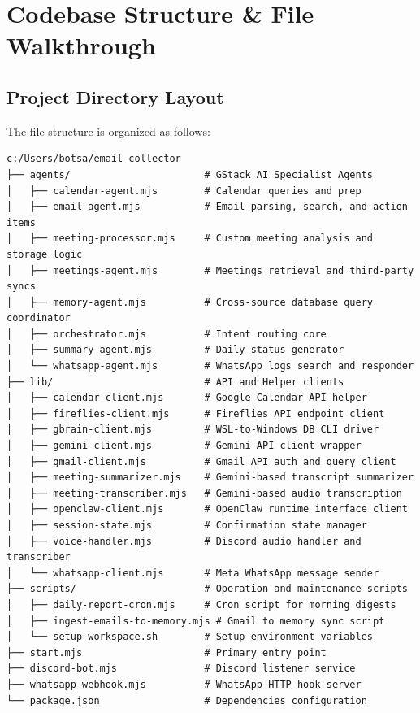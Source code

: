 \documentclass[12pt,a4paper]{report}
\begin{document}
\chapter{Codebase Structure \& File Walkthrough}
\label{chap:codebase}

\section{Project Directory Layout}
The file structure is organized as follows:
\begin{lstlisting}[basicstyle=\ttfamily\scriptsize]
c:/Users/botsa/email-collector
├── agents/                       # GStack AI Specialist Agents
│   ├── calendar-agent.mjs        # Calendar queries and prep
│   ├── email-agent.mjs           # Email parsing, search, and action items
│   ├── meeting-processor.mjs     # Custom meeting analysis and storage logic
│   ├── meetings-agent.mjs        # Meetings retrieval and third-party syncs
│   ├── memory-agent.mjs          # Cross-source database query coordinator
│   ├── orchestrator.mjs          # Intent routing core
│   ├── summary-agent.mjs         # Daily status generator
│   └── whatsapp-agent.mjs        # WhatsApp logs search and responder
├── lib/                          # API and Helper clients
│   ├── calendar-client.mjs       # Google Calendar API helper
│   ├── fireflies-client.mjs      # Fireflies API endpoint client
│   ├── gbrain-client.mjs         # WSL-to-Windows DB CLI driver
│   ├── gemini-client.mjs         # Gemini API client wrapper
│   ├── gmail-client.mjs          # Gmail API auth and query client
│   ├── meeting-summarizer.mjs    # Gemini-based transcript summarizer
│   ├── meeting-transcriber.mjs   # Gemini-based audio transcription
│   ├── openclaw-client.mjs       # OpenClaw runtime interface client
│   ├── session-state.mjs         # Confirmation state manager
│   ├── voice-handler.mjs         # Discord audio handler and transcriber
│   └── whatsapp-client.mjs       # Meta WhatsApp message sender
├── scripts/                      # Operation and maintenance scripts
│   ├── daily-report-cron.mjs     # Cron script for morning digests
│   ├── ingest-emails-to-memory.mjs # Gmail to memory sync script
│   └── setup-workspace.sh        # Setup environment variables
├── start.mjs                     # Primary entry point
├── discord-bot.mjs               # Discord listener service
├── whatsapp-webhook.mjs          # WhatsApp HTTP hook server
└── package.json                  # Dependencies configuration
\end{lstlisting}
\end{document}
